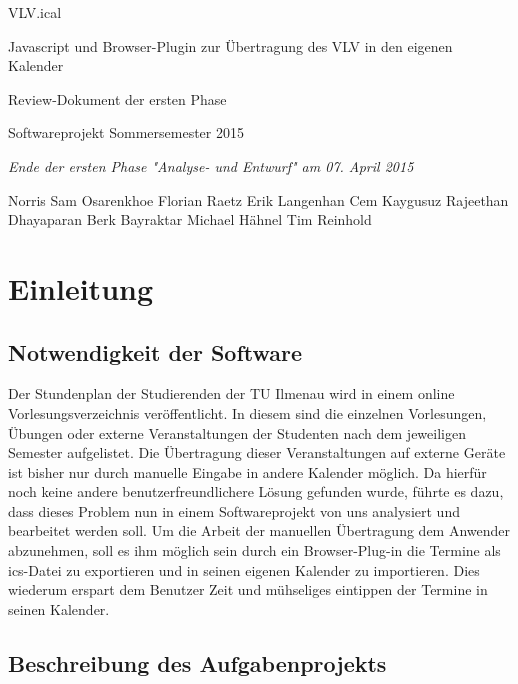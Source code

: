 \documentclass[11pt]{report}
\begin{document}
\begin{center}
\Huge
VLV.ical

\medskip
\large
Javascript und Browser-Plugin zur \"Ubertragung des VLV in den eigenen Kalender

\vskip 1in
\Large
Review-Dokument der ersten Phase

\large
\vskip 1in
Softwareprojekt Sommersemester 2015

\medskip
\textit{
Ende der ersten Phase "Analyse- und Entwurf" am 07. April 2015
}
\vskip 2in

\normalsize
\textup{ 
Norris Sam Osarenkhoe \qquad
Florian Raetz \qquad
}
\textup{ 
Erik Langenhan \qquad
Cem Kaygusuz \qquad
}
\textup{ 
Rajeethan Dhayaparan \qquad
Berk Bayraktar \qquad
}
\textup{ 
Michael H\"ahnel \qquad
Tim Reinhold
}
\end{center}

\newpage
\section*{Einleitung}
\subsection*{Notwendigkeit der Software}

\normalsize \normalfont \textnormal
Der Stundenplan der Studierenden der TU Ilmenau wird in einem online Vorlesungsverzeichnis veröffentlicht. In diesem sind die einzelnen Vorlesungen, Übungen oder externe Veranstaltungen der Studenten nach dem jeweiligen Semester aufgelistet. Die Übertragung dieser Veranstaltungen auf externe Geräte ist bisher nur durch manuelle Eingabe in andere Kalender möglich. Da hierfür noch keine andere benutzerfreundlichere Lösung gefunden wurde, führte es dazu, dass dieses Problem nun in einem Softwareprojekt von uns analysiert und bearbeitet werden soll.  
Um die Arbeit der manuellen Übertragung dem Anwender abzunehmen, soll es ihm möglich sein durch ein Browser-Plug-in die Termine als ics-Datei zu exportieren und in seinen eigenen Kalender zu importieren. Dies wiederum erspart dem Benutzer Zeit und mühseliges eintippen der Termine in seinen Kalender.

\subsection*{Beschreibung des Aufgabenprojekts}
\end{document}
